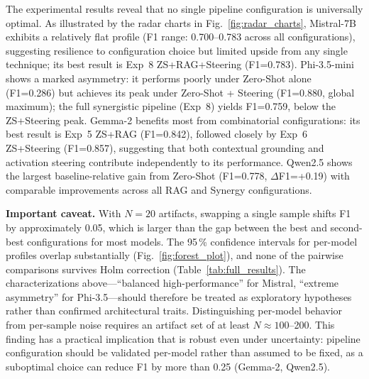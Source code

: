 \documentclass{ieeeaccess}
\begin{document}
The experimental results reveal that no single pipeline configuration is universally optimal. As illustrated by the radar charts in Fig.~\ref{fig:radar_charts}, Mistral-7B exhibits a relatively flat profile (F1 range: 0.700--0.783 across all configurations), suggesting resilience to configuration choice but limited upside from any single technique; its best result is Exp~8 ZS+RAG+Steering (F1=0.783). Phi-3.5-mini shows a marked asymmetry: it performs poorly under Zero-Shot alone (F1=0.286) but achieves its peak under Zero-Shot + Steering (F1=0.880, global maximum); the full synergistic pipeline (Exp~8) yields F1=0.759, below the ZS+Steering peak. Gemma-2 benefits most from combinatorial configurations: its best result is Exp~5 ZS+RAG (F1=0.842), followed closely by Exp~6 ZS+Steering (F1=0.857), suggesting that both contextual grounding and activation steering contribute independently to its performance. Qwen2.5 shows the largest baseline-relative gain from Zero-Shot (F1=0.778, $\Delta$F1=+0.19) with comparable improvements across all RAG and Synergy configurations.

\textbf{Important caveat.} With $N=20$ artifacts, swapping a single sample shifts F1 by approximately 0.05, which is larger than the gap between the best and second-best configurations for most models. The 95\,\% confidence intervals for per-model profiles overlap substantially (Fig.~\ref{fig:forest_plot}), and none of the pairwise comparisons survives Holm correction (Table~\ref{tab:full_results}). The characterizations above---``balanced high-performance'' for Mistral, ``extreme asymmetry'' for Phi-3.5---should therefore be treated as exploratory hypotheses rather than confirmed architectural traits. Distinguishing per-model behavior from per-sample noise requires an artifact set of at least $N \approx 100$--200. This finding has a practical implication that is robust even under uncertainty: pipeline configuration should be validated per-model rather than assumed to be fixed, as a suboptimal choice can reduce F1 by more than 0.25 (Gemma-2, Qwen2.5).
\end{document}
